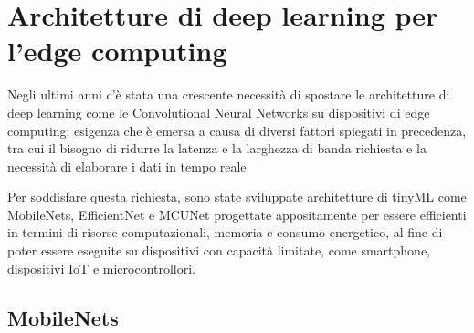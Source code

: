 \iffalse
-----------------------
cose da dire:
\begin{itemize}
    \item Funzionamento delle CNN: panoramica del funzionamento delle CNN, spiegare  convoluzione, pooling e struttura a strati. Descrivere l'importanza dei pesi dei neuroni e delle funzioni di attivazione nel processo di apprendimento delle CNN.
    \item Pre-elaborazione dei dati: Illustrare l'importanza della pre-elaborazione dei dati per la classificazione di immagini, inclusi normalizzazione dei pixel,  riduzione del rumore e gestione delle dimensioni delle immagini.
    \item Addestramento e ottimizzazione dei modelli: Spiegare il processo di addestramento dei modelli, incluso l'utilizzo di dataset, funzioni di costo e l'ottimizzazione dei parametri.
    \item Valutazione delle prestazioni dei modelli: Descrivere le metriche comuni utilizzate per valutare le prestazioni, come accuratezza, precisione, richiamo (f1 score)
\end{itemize}
\fi



\section{Architetture di deep learning per l'edge computing}

Negli ultimi anni c'è stata una crescente necessità di spostare le architetture di deep learning come le Convolutional Neural Networks su dispositivi di edge computing; esigenza che è emersa a causa di diversi fattori spiegati in precedenza, tra cui il bisogno di ridurre la latenza e la larghezza di banda richiesta e la necessità di elaborare i dati in tempo reale.

Per soddisfare questa richiesta, sono state sviluppate architetture di tinyML come MobileNets, EfficientNet e MCUNet progettate appositamente per essere efficienti in termini di risorse computazionali, memoria e consumo energetico, al fine di poter essere eseguite su dispositivi con capacità limitate, come smartphone, dispositivi IoT e microcontrollori.
\cite{MobileNets, EfficientNet, MCUNet}

\subsection{MobileNets}
\label{sec:mobilenets}

